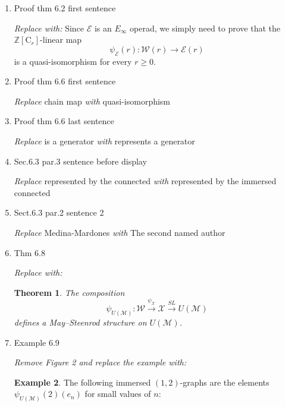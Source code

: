 \documentclass{amsart}
\newtheorem{theorem}{Theorem}
\theoremstyle{definition}
\newtheorem{example}[theorem]{Example}
\newcommand{\Z}{\mathbb{Z}}
\begin{document}
\begin{enumerate}
\item Proof thm 6.2 first sentence \par
\textit{Replace with:}
Since $\mathcal E$ is an $E_\infty$ operad, we simply need to prove that the $\Z[\mathrm{C}_r]$-linear map
\begin{equation*}
\psi_{\mathcal E}(r) \colon \mathcal W(r) \to \mathcal E(r)
\end{equation*}
is a quasi-isomorphism for every $r \geq 0$.

\item Proof thm 6.6 first sentence \par
\textit{Replace} chain map \textit{with} quasi-isomorphism

\item Proof thm 6.6 last sentence \par
\textit{Replace} is a generator \textit{with} represents a generator

\item Sec.6.3 par.3 sentence before display\par
\textit{Replace} represented by the connected \textit{with} represented by the immersed connected

\item Sect.6.3 par.2 sentence 2 \par
\textit{Replace} Medina-Mardones \textit{with} The second named author

\item Thm 6.8\par
\textit{Replace with:}
\begin{theorem} \label{thm: Steenrod-Adem on U(M)}
	The composition
	\begin{equation*}
	\psi_{U(\mathcal M)} \colon \mathcal W \xrightarrow{\psi_{\mathcal X}} \mathcal X \xrightarrow{SL} U(\mathcal M)
	\end{equation*}
	defines a May--Steenrod structure on $U(\mathcal M)$.
\end{theorem}

\item Example 6.9 \par
\textit{Remove Figure 2 and replace the example with:}

\begin{example}
	The following immersed $(1,2)$-graphs are the elements $\psi_{U(\mathcal M)}(2)(e_n)$ for small values of $n$:
\begin{center}
\end{center}
\end{example}
\end{enumerate}
\end{document}
